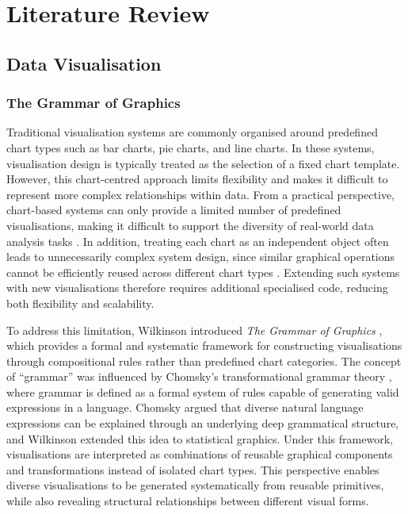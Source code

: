\chapter{Literature Review}
\section{Data Visualisation}
\subsection{The Grammar of Graphics}

Traditional visualisation systems are commonly organised around predefined chart types such as bar charts, pie charts, and line charts. In these systems, visualisation design is typically treated as the selection of a fixed chart template. However, this chart-centred approach limits flexibility and makes it difficult to represent more complex relationships within data. From a practical perspective, chart-based systems can only provide a limited number of predefined visualisations, making it difficult to support the diversity of real-world data analysis tasks \cite{wilkinson2005grammar}. In addition, treating each chart as an independent object often leads to unnecessarily complex system design, since similar graphical operations cannot be efficiently reused across different chart types \cite{wilkinson2005grammar}. Extending such systems with new visualisations therefore requires additional specialised code, reducing both flexibility and scalability. 

To address this limitation, Wilkinson introduced \textit{The Grammar of Graphics} \cite{wilkinson2005grammar}, which provides a formal and systematic framework for constructing visualisations through compositional rules rather than predefined chart categories. The concept of ``grammar'' was influenced by Chomsky's transformational grammar theory \cite{chomsky2002syntactic}, where grammar is defined as a formal system of rules capable of generating valid expressions in a language. Chomsky \cite{chomsky2014aspects} argued that diverse natural language expressions can be explained through an underlying deep grammatical structure, and Wilkinson extended this idea to statistical graphics. Under this framework, visualisations are interpreted as combinations of reusable graphical components and transformations instead of isolated chart types. This perspective enables diverse visualisations to be generated systematically from reusable primitives, while also revealing structural relationships between different visual forms. 

